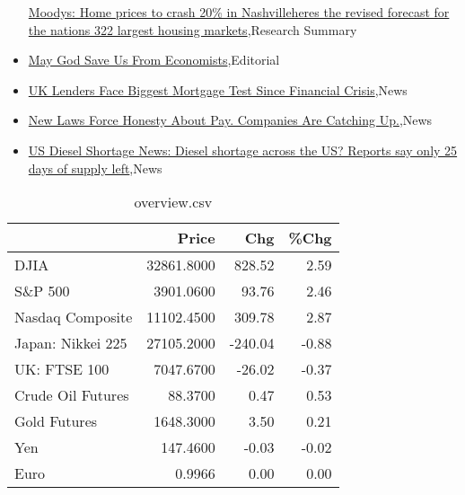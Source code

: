 \documentclass{article}%
\begin{document}
\begin{itemize}
\href{https://reddit.com/r/Economics/comments/ygt9ld/moodys\_home\_prices\_to\_crash\_20\_in\_nashvilleheres/}{Moodys: Home prices to crash 20\% in Nashvilleheres the revised forecast for the nations 322 largest housing markets},Research Summary%
\item%
\href{https://reddit.com/r/Economics/comments/ygomsy/may\_god\_save\_us\_from\_economists/}{May God Save Us From Economists},Editorial%
\item%
\href{https://reddit.com/r/Economics/comments/ygombc/uk\_lenders\_face\_biggest\_mortgage\_test\_since/}{UK Lenders Face Biggest Mortgage Test Since Financial Crisis},News%
\item%
\href{https://reddit.com/r/Economics/comments/ygjpnc/new\_laws\_force\_honesty\_about\_pay\_companies\_are/}{New Laws Force Honesty About Pay. Companies Are Catching Up.},News%
\item%
\href{https://reddit.com/r/Economics/comments/yghsve/us\_diesel\_shortage\_news\_diesel\_shortage\_across/}{US Diesel Shortage News: Diesel shortage across the US? Reports say only 25 days of supply left},News%
\end{itemize}%


\begin{table}[htbp]%
\caption{overview.csv}%
\centering%
\begin{adjustbox}{width=1\textwidth}%
\begin{tabular}{lrrr}
\toprule
                  &      Price &     Chg &  \%Chg \\
\midrule
             DJIA & 32861.8000 &  828.52 &  2.59 \\
          S\&P 500 &  3901.0600 &   93.76 &  2.46 \\
 Nasdaq Composite & 11102.4500 &  309.78 &  2.87 \\
Japan: Nikkei 225 & 27105.2000 & -240.04 & -0.88 \\
     UK: FTSE 100 &  7047.6700 &  -26.02 & -0.37 \\
Crude Oil Futures &    88.3700 &    0.47 &  0.53 \\
     Gold Futures &  1648.3000 &    3.50 &  0.21 \\
              Yen &   147.4600 &   -0.03 & -0.02 \\
             Euro &     0.9966 &    0.00 &  0.00 \\
\bottomrule
\end{tabular}
%
\end{adjustbox}%
\end{table}
\end{document}
